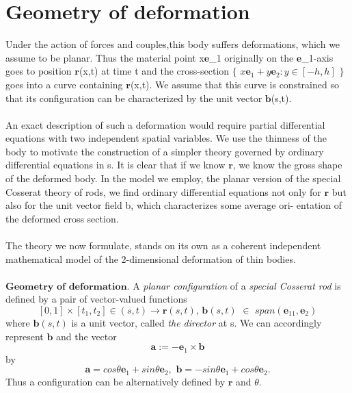 \documentclass[12pt]{article}
\begin{document}
\section{Geometry of deformation}
Under the action of forces and couples,this body suffers deformations, which we assume to be planar. Thus the material point x$\mathbf{e}$_1 originally on the $\mathbf{e}$_1-axis goes to position $\mathbf{r}$(x,t) at time t and the cross-section  $\{$
$x\mathbf{e}_1 + y\mathbf{e}_2:y \in[-h,h]$ 
$\}$ goes into a curve containing $\mathbf{r}$(x,t). We assume that this curve is constrained so that its configuration can be characterized by the unit vector $\mathbf{b}$(s,t).
\\\\
An exact description of such a deformation would require partial differential equations with two independent spatial variables. We use the thinness of the body to motivate the construction of a simpler theory governed by ordinary differential equations in s. It is clear that if we know $\mathbf{r}$, we know the gross shape of the deformed body. In the model we employ, the planar version of the special Cosserat theory of rods, we find ordinary differential equations not only for $\mathbf{r}$ but also for the unit vector field b, which characterizes some average ori- entation of the deformed cross section. 
\\\\
The theory we now formulate, stands on its own as a coherent independent mathematical model of the 2-dimensional deformation of thin bodies.
\\\\
$\mathbf{Geometry}\,\,\mathbf{of}\,\,\mathbf{deformation}.$ A \emph{planar configuration} of a \emph{special Cosserat rod} is defined by a pair of vector-valued functions
\[[0,1] × [t_1,t_2] \in (s,t) → \mathbf{r}(s,t),\,\mathbf{b}(s,t)\,\,\in\,\,span(\mathbf{e}_11,\mathbf{e}_2)\]
where $\mathbf{b}(s,t)$ is a unit vector, called \emph{the director} at s. We can accordingly
represent $\mathbf{b}$ and the vector 
\[ \mathbf{a} := −\mathbf{e}_1 \times \mathbf{b}\]
by 
\[ \mathbf{a}=cos\theta\mathbf{e}_1+sin\theta\mathbf{e}_2,\,\,\mathbf{b}=−sin\theta\mathbf{e}_1+cos\theta\mathbf{e}_2.\]
Thus a configuration can be alternatively defined by $\mathbf{r}$ and $\theta$.
\end{document}

